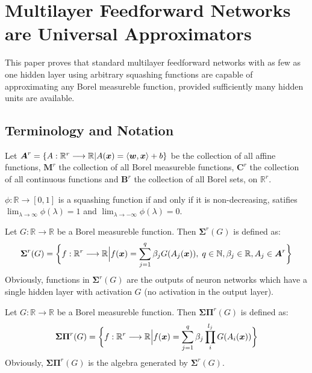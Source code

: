 \section{Multilayer Feedforward Networks are Universal Approximators}
This paper\cite{hornik_1989} proves that standard multilayer feedforward networks with as few as one hidden 
layer using arbitrary squashing functions are capable of approximating any Borel measureble function, provided
sufficiently many hidden units are available.

\subsection{Terminology and Notation}
Let $\boldsymbol{A}^r = \left\{A: \mathbb{R}^r \longrightarrow \mathbb{R} | A(\boldsymbol{x}) = \langle \boldsymbol{w}, \boldsymbol{x}
\rangle + b\right\}$ be the collection of all affine functions, $\boldsymbol{M}^r$ the collection of all 
Borel measureble functions, $\boldsymbol{C}^r$ the collection of all continuous functions and 
$\boldsymbol{B}^r$ the collection of all Borel sets, on $\mathbb{R}^r$.

\begin{df}
    $\phi: \mathbb{R}\longrightarrow [0, 1]$ is a squashing function if and only if it is 
    non-decreasing, satifies $\displaystyle\lim_{\lambda \to \infty}\phi(\lambda) = 1$ and 
    $\displaystyle\lim_{\lambda \to -\infty}\phi(\lambda) = 0$.
\end{df}

\begin{df}
    Let $G: \mathbb{R} \longrightarrow \mathbb{R}$ be a Borel measureble function. Then 
    $\boldsymbol{\Sigma}^r(G)$ is defined as:
    $$\boldsymbol{\Sigma}^r(G) = \bigg\{f: \mathbb{R}^r \longrightarrow \mathbb{R} \Big| f(\boldsymbol{x}) = 
    \sum_{j = 1}^q \beta_j G(A_j(\boldsymbol{x})),\; q\in\mathbb{N}, \beta_j\in\mathbb{R}, A_j\in\boldsymbol{A}^r
    \bigg\}$$
    Obviously, functions in $\boldsymbol{\Sigma}^r(G)$ are the outputs of neuron networks which have a single
    hidden layer with activation $G$ (no activation in the output layer).
\end{df}

\begin{df}
    Let $G: \mathbb{R} \longrightarrow \mathbb{R}$ be a Borel measureble function. Then 
    $\boldsymbol{\Sigma\Pi}^r(G)$ is defined as:
    $$\boldsymbol{\Sigma\Pi}^r(G) = \bigg\{f: \mathbb{R}^r \longrightarrow \mathbb{R} \Big| f(\boldsymbol{x}) = 
    \sum_{j = 1}^q \beta_j\prod_i^{l_j} G(A_i(\boldsymbol{x}))\bigg\}$$
    Obviously, $\boldsymbol{\Sigma\Pi}^r(G)$ is the algebra generated by $\boldsymbol{\Sigma}^r(G)$.
\end{df}

